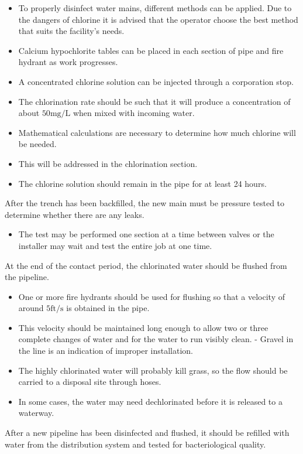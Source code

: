 \documentclass[10pt]{article}
\begin{document}
\begin{itemize}
  \item To properly disinfect water mains, different methods can be applied. Due to the dangers of chlorine it is advised that the operator choose the best method that suits the facility's needs.

  \item Calcium hypochlorite tables can be placed in each section of pipe and fire hydrant as work progresses.

  \item A concentrated chlorine solution can be injected through a corporation stop.

  \item The chlorination rate should be such that it will produce a concentration of about $50 \mathrm{mg} / \mathrm{L}$ when mixed with incoming water.

  \item Mathematical calculations are necessary to determine how much chlorine will be needed.

  \item This will be addressed in the chlorination section.

  \item The chlorine solution should remain in the pipe for at least 24 hours.

\end{itemize}
After the trench has been backfilled, the new main must be pressure tested to determine whether there are any leaks.

\begin{itemize}
  \item The test may be performed one section at a time between valves or the installer may wait and test the entire job at one time.
\end{itemize}
At the end of the contact period, the chlorinated water should be flushed from the pipeline.

\begin{itemize}
  \item One or more fire hydrants should be used for flushing so that a velocity of around $5 \mathrm{ft} / \mathrm{s}$ is obtained in the pipe.

  \item This velocity should be maintained long enough to allow two or three complete changes of water and for the water to run visibly clean. - Gravel in the line is an indication of improper installation.

  \item The highly chlorinated water will probably kill grass, so the flow should be carried to a disposal site through hoses.

  \item In some cases, the water may need dechlorinated before it is released to a waterway.

\end{itemize}
After a new pipeline has been disinfected and flushed, it should be refilled with water from the distribution system and tested for bacteriological quality.
\end{document}
